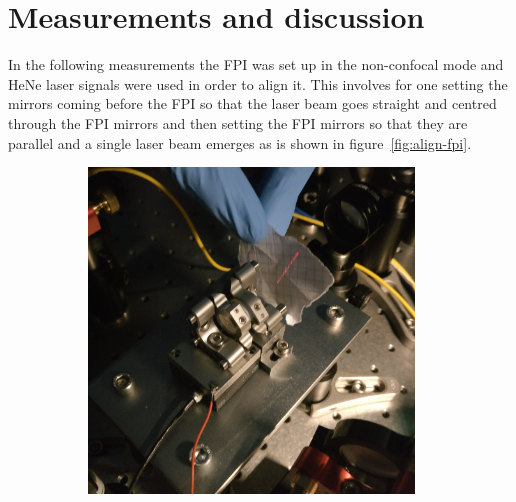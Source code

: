 \section{Measurements and discussion}
\label{sec:fabry-measurements}

In the following measurements the \ac{FPI} was set up in the non-confocal mode and HeNe laser signals were used in order to align it.
This involves for one setting the mirrors coming before the \ac{FPI} so that the laser beam goes straight and centred through the \ac{FPI} mirrors and then setting the \ac{FPI} mirrors so that they are parallel and a single laser beam emerges as is shown in figure~\ref{fig:align-fpi}.


\begin{figure}[H]
	\centering
	\begin{subfigure}[b]{0.48\textwidth}
		\centering
		\includegraphics[width=0.95\textwidth]{figures/fabry-perot/setup/confocal-setup-higher-modes-1}
		\caption{}
		\label{fig:confocal-setup-higher-modes-1}
	\end{subfigure}%
	~ %
	\begin{subfigure}[b]{0.48\textwidth}
		\centering

\end{subfigure}
\end{figure}
